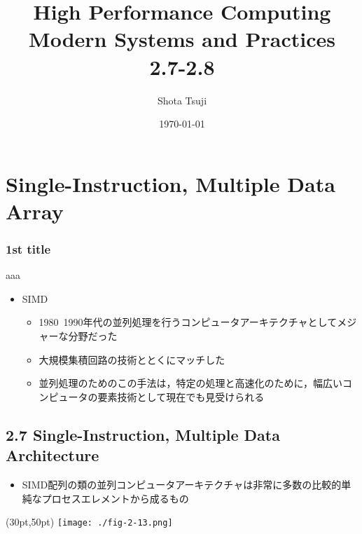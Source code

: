 \documentclass[12pt, unicode, dvipdfmx, t]{beamer}
\begin{document}
\title[group-reading]{High Performance Computing\\Modern Systems and Practices\\2.7-2.8}
\author{Shota Tsuji}
\date{\today}

\begin{frame}
	\titlepage
\end{frame}

\begin{frame}
	\tableofcontents
\end{frame}

\section{Single-Instruction, Multiple Data Array}
\begin{frame}[t]
	\frametitle{1st title}
	aaa
	\begin{itemize}
		\item SIMD
		\begin{itemize}
			\item 1980~1990年代の並列処理を行うコンピュータアーキテクチャとしてメジャーな分野だった
			\item 大規模集積回路の技術ととくにマッチした
			\item 並列処理のためのこの手法は，特定の処理と高速化のために，幅広いコンピュータの要素技術として現在でも見受けられる
		\end{itemize}
	\end{itemize}
\end{frame}

\subsection{2.7 Single-Instruction, Multiple Data Architecture}
\begin{frame}[t]
	\begin{itemize}
		\item SIMD配列の類の並列コンピュータアーキテクチャは非常に多数の比較的単純なプロセスエレメントから成るもの
	\end{itemize}
	\begin{textblock*}{0.8\linewidth}(30pt,50pt)
		\centering
		\texttt{[image: ./fig-2-13.png]}
	\end{textblock*}

\end{frame}
\end{document}
